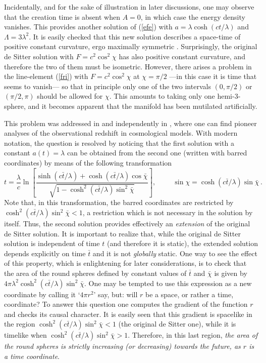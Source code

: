 \documentclass[12pt]{iopart}
\begin{document}
Incidentally, and for the sake of illustration in later discussions, one may observe that the creation time is absent when $A=0$, in which case the energy density vanishes. This provides another solution of (\ref{efe}) with $a=\lambda \cosh (ct/\lambda)$ and $\Lambda =3\lambda^2$. It is easily checked that this new solution describes a space-time of positive constant curvature, ergo maximally symmetric \cite{Ei,We,MTW}. Surprisingly, the original de Sitter solution with $F=c^2 \cos^2\chi$ has also positive constant curvature, and therefore the two of them  must be isometric. However, there arises a problem in the line-element (\ref{fri}) with $F=c^2 \cos^2\chi$ at $\chi =\pi/2$ ---in this case it is time that seems to vanish--- so that in principle only one of the two intervals $(0,\pi/2)$ or $(\pi/2,\pi)$ should be allowed for $\chi$. This amounts to taking only one hemi-3-sphere, and it becomes apparent that the manifold has been mutilated artificially. 

This problem was addressed in \cite{lanczos,lanczos2} and independently in \cite{weyl}, where one can find pioneer analyses of the observational redshift in cosmological models. With modern notation, the question is resolved by noticing that the first  solution with a constant $a(t)=\lambda$ can be obtained from the second one (written with barred coordinates) by means of the following transformation
$$
t=\frac{\lambda}{c}\ln\left[\frac{\sinh (c\bar t/\lambda)+\cosh (c\bar t/\lambda)\cos\bar\chi}
{\sqrt{1-\cosh^2(c\bar t/\lambda)\sin^2\bar\chi}}\right], \hspace{1cm}
\sin\chi=\cosh (c\bar t/\lambda)\sin\bar\chi \, .
$$
Note that, in this transformation, the barred coordinates are restricted by $\cosh^2(c\bar t/\lambda)\sin^2\bar\chi <1$, a restriction which is not necessary in the solution by itself. Thus, the second solution provides effectively an {\em extension} of the original de Sitter solution. It is important to realize that, while the original de Sitter solution is independent of time $t$ (and therefore it is static), the extended solution depends explicitly on time $\bar t$ and it is not {\em globally} static. One way to see the effect of this property, which is enlightening for later considerations, is to check that the area of the round spheres defined by constant values of $\bar t$ and $\bar \chi$ is given by  $4\pi \lambda^2 \cosh^2(c\bar t/\lambda) \sin^2\bar\chi$. One may be tempted to use this expression as a new coordinate by calling it `$4\pi r^2$' say, but: will $r$ be a space, or rather a time, coordinate? To answer this question one computes the gradient of the function $r$ and checks its causal character. It is easily seen that this gradient is spacelike in the region $\cosh^2(c\bar t/\lambda)\sin^2\bar\chi <1$ (the original de Sitter one), while it is timelike when $\cosh^2(c\bar t/\lambda)\sin^2\bar\chi >1$. Therefore, in this last region, {\em the area of the round spheres is strictly increasing (or decreasing) towards the future, as $r$ is a time coordinate}.
\end{document}
